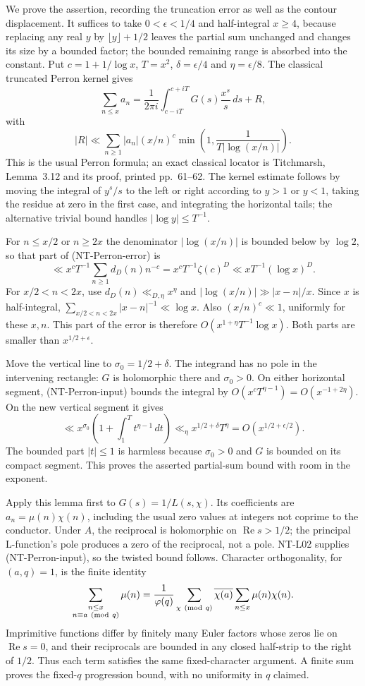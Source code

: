 \documentclass[11pt,a4paper]{article}
\begin{document}
We prove the assertion, recording the truncation error as well as the
contour displacement.  It suffices to take $0<\epsilon<1/4$ and
half-integral $x\ge4$, because replacing any real $y$ by
$\lfloor y\rfloor+1/2$ leaves the partial sum unchanged and changes its
size by a bounded factor; the bounded remaining range is absorbed into
the constant.  Put
$c=1+1/\log x$, $T=x^2$, $\delta=\epsilon/4$ and
$\eta=\epsilon/8$.  The classical truncated Perron kernel gives
\[
 \sum_{n\le x}a_n=
 \frac1{2\pi i}\int_{c-iT}^{c+iT}G(s)\frac{x^s}{s}\,ds+R,
\]
with
\[
 |R|\ll\sum_{n\ge1}|a_n|(x/n)^c
           \min\left(1,\frac1{T|\log(x/n)|}\right).
\tag{NT-Perron-error}
\]
This is the usual Perron formula; an exact classical locator is
Titchmarsh, Lemma~3.12 and its proof, printed pp.~61--62.  The kernel
estimate follows by moving the integral of $y^s/s$ to the left or right
according to $y>1$ or $y<1$, taking the residue at zero in the first
case, and integrating the horizontal tails; the alternative trivial
bound handles $|\log y|\le T^{-1}$.

For $n\le x/2$ or $n\ge2x$ the denominator $|\log(x/n)|$ is bounded
below by $\log2$, so that part of (NT-Perron-error) is
\[
 \ll x^cT^{-1}\sum_{n\ge1}d_D(n)n^{-c}
 =x^cT^{-1}\zeta(c)^D\ll xT^{-1}(\log x)^D.
\]
For $x/2<n<2x$, use $d_D(n)\ll_{D,\eta}x^\eta$ and
$|\log(x/n)|\gg |x-n|/x$.  Since $x$ is half-integral,
$\sum_{x/2<n<2x}|x-n|^{-1}\ll\log x$.  Also $(x/n)^c\ll1$,
uniformly for these $x,n$.  This part of the error is therefore
$O(x^{1+\eta}T^{-1}\log x)$.  Both parts are smaller than
$x^{1/2+\epsilon}$.

Move the vertical line to $\sigma_0=1/2+\delta$.  The integrand has no
pole in the intervening rectangle: $G$ is holomorphic there and
$\sigma_0>0$.  On either horizontal segment,
(NT-Perron-input) bounds the integral by
$O(x^cT^{\eta-1})=O(x^{-1+2\eta})$.
On the new vertical segment it gives
\[
 \ll x^{\sigma_0}\left(1+\int_1^Tt^{\eta-1}\,dt\right)
 \ll_\eta x^{1/2+\delta}T^\eta
 =O(x^{1/2+\epsilon/2}).
\]
The bounded part $|t|\le1$ is harmless because $\sigma_0>0$ and $G$
is bounded on its compact segment.  This proves the asserted partial-sum
bound with room in the exponent.

Apply this lemma first to $G(s)=1/L(s,\chi)$.
Its coefficients are $a_n=\mu(n)\chi(n)$, including the usual zero
values at integers not coprime to the conductor.  Under $A$, the
reciprocal is holomorphic on $\operatorname{Re}s>1/2$; the principal
L-function's pole produces a zero of the reciprocal, not a pole.
NT-L02 supplies (NT-Perron-input), so the twisted bound follows.
Character orthogonality, for $(a,q)=1$, is the finite identity
\[
 \sum_{\substack{n\le x\\n\equiv a\ ({\rm mod}\ q)}}\mu(n)
 =\frac1{\varphi(q)}\sum_{\chi\ ({\rm mod}\ q)}
       \overline{\chi(a)}\sum_{n\le x}\mu(n)\chi(n).
\]
Imprimitive functions differ by finitely many Euler factors whose zeros
lie on $\operatorname{Re}s=0$, and their reciprocals are bounded in any
closed half-strip to the right of $1/2$.  Thus each term satisfies the
same fixed-character argument.  A finite sum proves the fixed-$q$
progression bound, with no uniformity in $q$ claimed.
\end{document}
